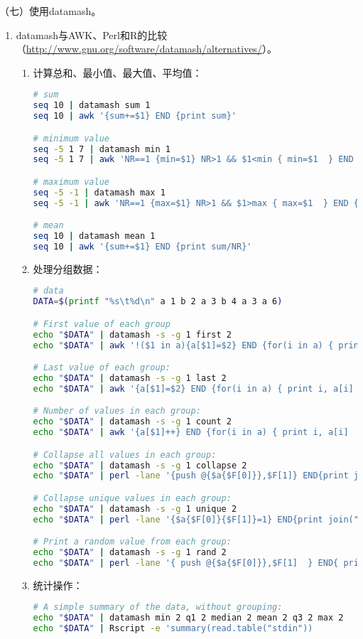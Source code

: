 \vspace{0.1in}
（七）使用datamash。
\begin{enumerate}
  \item datamash与AWK、Perl和R的比较（\href{http://www.gnu.org/software/datamash/alternatives/}{http://www.gnu.org/software/datamash/alternatives/}）。
    \begin{enumerate}
      \item 计算总和、最小值、最大值、平均值：
\begin{lstlisting}[language=bash]
# sum
seq 10 | datamash sum 1
seq 10 | awk '{sum+=$1} END {print sum}'

# minimum value
seq -5 1 7 | datamash min 1
seq -5 1 7 | awk 'NR==1 {min=$1} NR>1 && $1<min { min=$1  } END {print min}'

# maximum value
seq -5 -1 | datamash max 1
seq -5 -1 | awk 'NR==1 {max=$1} NR>1 && $1>max { max=$1  } END {print max}'

# mean
seq 10 | datamash mean 1
seq 10 | awk '{sum+=$1} END {print sum/NR}'
\end{lstlisting}
      \item 处理分组数据：
\begin{lstlisting}[language=bash]
# data
DATA=$(printf "%s\t%d\n" a 1 b 2 a 3 b 4 a 3 a 6)

# First value of each group
echo "$DATA" | datamash -s -g 1 first 2
echo "$DATA" | awk '!($1 in a){a[$1]=$2} END {for(i in a) { print i, a[i] }}'

# Last value of each group:
echo "$DATA" | datamash -s -g 1 last 2
echo "$DATA" | awk '{a[$1]=$2} END {for(i in a) { print i, a[i]  }}'

# Number of values in each group:
echo "$DATA" | datamash -s -g 1 count 2
echo "$DATA" | awk '{a[$1]++} END {for(i in a) { print i, a[i]  }}'

# Collapse all values in each group:
echo "$DATA" | datamash -s -g 1 collapse 2
echo "$DATA" | perl -lane '{push @{$a{$F[0]}},$F[1]} END{print join("\n",map{"$_ ".join(",",@{$a{$_}})} sort keys %a);}'

# Collapse unique values in each group:
echo "$DATA" | datamash -s -g 1 unique 2
echo "$DATA" | perl -lane '{$a{$F[0]}{$F[1]}=1} END{print join("\n",map{"$_ ".join(",",sort keys %{$a{$_}})} sort keys %a);}'

# Print a random value from each group:
echo "$DATA" | datamash -s -g 1 rand 2
echo "$DATA" | perl -lane '{ push @{$a{$F[0]}},$F[1]  } END{ print join("\n",map{"$_ ".$a{$_}->[rand(@{$a{$_}})] } sort keys %a ) ; }'
\end{lstlisting}
      \item 统计操作：
\begin{lstlisting}[language=bash]
# A simple summary of the data, without grouping:
echo "$DATA" | datamash min 2 q1 2 median 2 mean 2 q3 2 max 2
echo "$DATA" | Rscript -e 'summary(read.table("stdin"))


\end{lstlisting}
\end{enumerate}
\end{enumerate}
